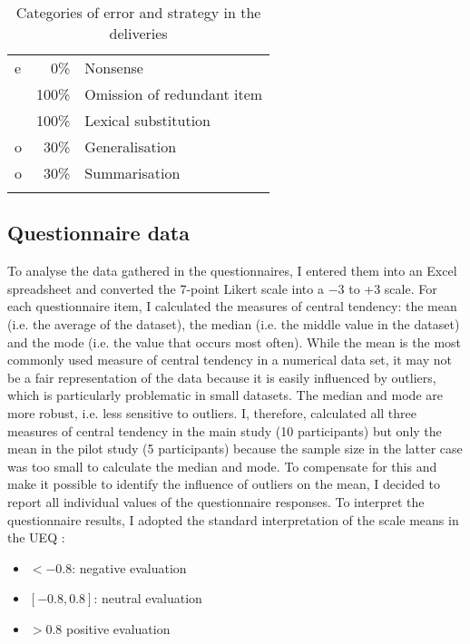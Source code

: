 \begin{table}
\begin{tabularx}{\textwidth}{lrQ}
e                                                             & 0\%                                                                    & Nonsense                   \\
                                                              & 100\%                                                                  & Omission of redundant item \\
                                                              & 100\%                                                                  & Lexical substitution       \\
o                                                             & 30\%                                                                   & Generalisation             \\
o                                                             & 30\%                                                                   & Summarisation              \\
\lspbottomrule
\end{tabularx}
\caption{Categories of error and strategy in the deliveries}
\label{tab:12}
\end{table}


\subsection{Questionnaire data}


To analyse the data gathered in the questionnaires, I entered them into an Excel spreadsheet and converted the 7-point Likert scale into a $-$3 to +3 scale. For each questionnaire item, I calculated the measures of central tendency: the mean (i.e. the average of the dataset), the median (i.e. the middle value in the dataset) and the mode (i.e. the value that occurs most often). While the mean is the most commonly used measure of central tendency in a numerical data set, it may not be a fair representation of the data because it is easily influenced by outliers, which is particularly problematic in small datasets. The median and mode are more robust, i.e. less sensitive to outliers. I, therefore, calculated all three measures of central tendency in the main study (10 participants) but only the mean in the pilot study (5 participants) because the sample size in the latter case was too small to calculate the median and mode. To compensate for this and make it possible to identify the influence of outliers on the mean, I decided to report all individual values of the questionnaire responses. To interpret the questionnaire results, I adopted the standard interpretation of the scale means in the UEQ \citep{laugwitz2008construction}:
\begin{itemize}
    \item $< -0.8$: negative evaluation
\item $[-0.8 , 0.8]$: neutral evaluation
\item $> 0.8$ positive evaluation
\end{itemize}


